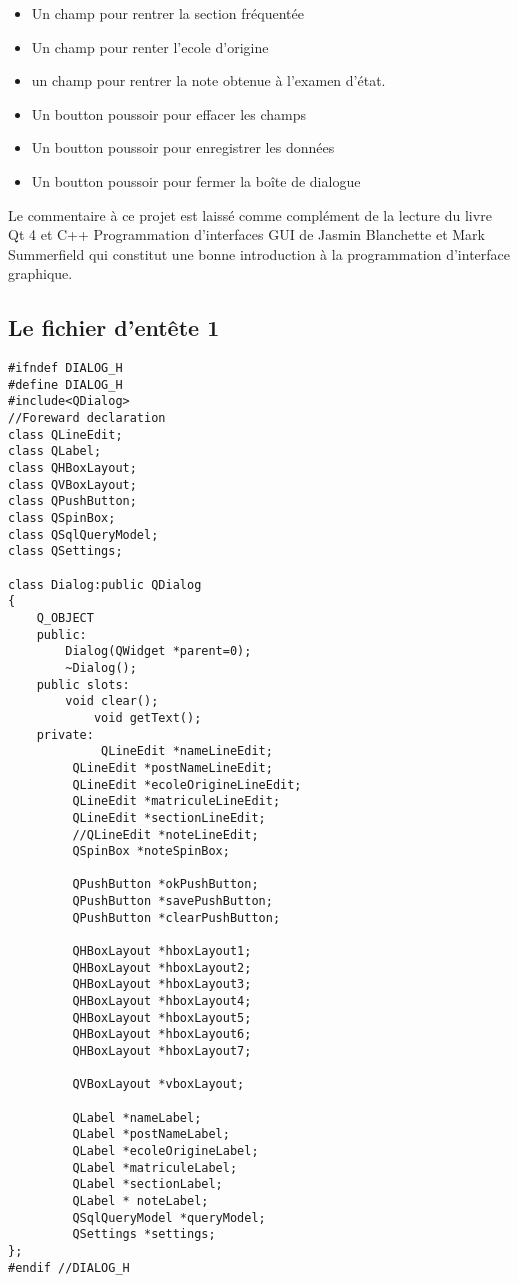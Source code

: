 \documentclass[a4paper, oneside,11pt]{book}
\begin{document}
\begin{enumerate}
\begin{itemize}
\begin{itemize}
\item Un champ pour rentrer la section fr\'equent\'ee
\item Un champ pour renter l'ecole d'origine
\item un champ pour rentrer la note obtenue \`a l'examen d'\'etat.
\item Un boutton poussoir pour effacer les champs  
\item Un boutton poussoir pour enregistrer les donn\'ees 
\item Un boutton poussoir pour fermer la bo\^ite de dialogue
\end{itemize}
\end{itemize}
\end{enumerate}

Le commentaire \`a ce projet est laiss\'e comme compl\'ement de la lecture du 
livre Qt 4 et C++ Programmation d’interfaces GUI de Jasmin Blanchette et Mark 
Summerfield qui constitut une bonne introduction \`a la programmation d'interface graphique.
\subsection*{Le fichier d'ent\^ete 1}




\begin{lstlisting}
#ifndef DIALOG_H
#define DIALOG_H
#include<QDialog>
//Foreward declaration
class QLineEdit;
class QLabel;
class QHBoxLayout;
class QVBoxLayout;
class QPushButton;
class QSpinBox;
class QSqlQueryModel;
class QSettings;

class Dialog:public QDialog
{
	Q_OBJECT
	public:
		Dialog(QWidget *parent=0);
		~Dialog();
	public slots:
		void clear();
	        void getText();
	private:
	         QLineEdit *nameLineEdit;
		 QLineEdit *postNameLineEdit;
		 QLineEdit *ecoleOrigineLineEdit;
		 QLineEdit *matriculeLineEdit;
		 QLineEdit *sectionLineEdit;
		 //QLineEdit *noteLineEdit;
		 QSpinBox *noteSpinBox;

		 QPushButton *okPushButton;
		 QPushButton *savePushButton;
		 QPushButton *clearPushButton;

		 QHBoxLayout *hboxLayout1;
		 QHBoxLayout *hboxLayout2;
		 QHBoxLayout *hboxLayout3;
		 QHBoxLayout *hboxLayout4;
		 QHBoxLayout *hboxLayout5;
		 QHBoxLayout *hboxLayout6;
		 QHBoxLayout *hboxLayout7;

		 QVBoxLayout *vboxLayout;

		 QLabel *nameLabel;
		 QLabel *postNameLabel;
		 QLabel *ecoleOrigineLabel;
		 QLabel *matriculeLabel;
		 QLabel *sectionLabel;
		 QLabel * noteLabel;
		 QSqlQueryModel *queryModel;
		 QSettings *settings;
};
#endif //DIALOG_H
\end{lstlisting}
\end{document}
